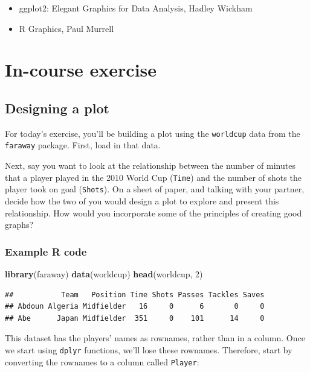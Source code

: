 \documentclass[]{book}
\makeatletter
\newenvironment{Shaded}{\begin{snugshade}}{\end{snugshade}}
\newcommand{\KeywordTok}[1]{\textcolor[rgb]{0.13,0.29,0.53}{\textbf{{#1}}}}
\newcommand{\DecValTok}[1]{\textcolor[rgb]{0.00,0.00,0.81}{{#1}}}
\newcommand{\NormalTok}[1]{{#1}}
\providecommand{\tightlist}{%
  \setlength{\itemsep}{0pt}\setlength{\parskip}{0pt}}
\newenvironment{kframe}{%
\medskip{}
\setlength{\fboxsep}{.8em}
 \def\at@end@of@kframe{}%
 \ifinner\ifhmode%
  \def\at@end@of@kframe{\end{minipage}}%
  \begin{minipage}{\columnwidth}%
 \fi\fi%
 \def\FrameCommand##1{\hskip\@totalleftmargin \hskip-\fboxsep
 \colorbox{shadecolor}{##1}\hskip-\fboxsep
     \hskip-\linewidth \hskip-\@totalleftmargin \hskip\columnwidth}%
 \MakeFramed {\advance\hsize-\width
   \@totalleftmargin\z@ \linewidth\hsize
   \@setminipage}}%
 {\par\unskip\endMakeFramed%
 \at@end@of@kframe}
\renewenvironment{Shaded}{\begin{kframe}}{\end{kframe}}
\makeatother
\begin{document}
\begin{itemize}
\tightlist
\item
  ggplot2: Elegant Graphics for Data Analysis, Hadley Wickham
\item
  R Graphics, Paul Murrell
\end{itemize}

\section{In-course exercise}\label{in-course-exercise-3}

\subsection{Designing a plot}\label{designing-a-plot}

For today's exercise, you'll be building a plot using the
\texttt{worldcup} data from the \texttt{faraway} package. First, load in
that data.

Next, say you want to look at the relationship between the number of
minutes that a player played in the 2010 World Cup (\texttt{Time}) and
the number of shots the player took on goal (\texttt{Shots}). On a sheet
of paper, and talking with your partner, decide how the two of you would
design a plot to explore and present this relationship. How would you
incorporate some of the principles of creating good graphs?

\subsubsection{Example R code}\label{example-r-code-4}

\begin{Shaded}
\begin{Highlighting}[]
\KeywordTok{library}\NormalTok{(faraway)}
\KeywordTok{data}\NormalTok{(worldcup)}
\KeywordTok{head}\NormalTok{(worldcup, }\DecValTok{2}\NormalTok{)}
\end{Highlighting}
\end{Shaded}

\begin{verbatim}
##           Team   Position Time Shots Passes Tackles Saves
## Abdoun Algeria Midfielder   16     0      6       0     0
## Abe      Japan Midfielder  351     0    101      14     0
\end{verbatim}

This dataset has the players' names as rownames, rather than in a
column. Once we start using \texttt{dplyr} functions, we'll lose these
rownames. Therefore, start by converting the rownames to a column called
\texttt{Player}:
\end{document}
